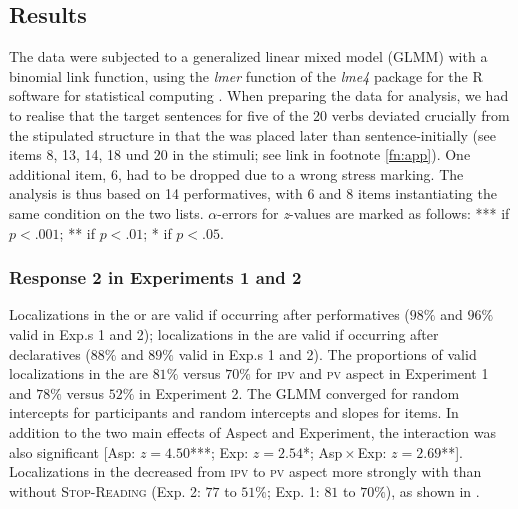 \documentclass[output=paper,colorlinks,citecolor=brown,newtxmath,hidelinks]{langscibook}
\begin{document}
\subsection{Results}

The data were subjected to a generalized linear mixed model (GLMM) with a binomial link function, using the \textit{lmer} function of the \textit{lme4} package \citep{Bates2015} for the R software for statistical computing \citep{team2014r}.
When preparing the data for analysis, we had to realise that the  target sentences for five of the 20 verbs deviated crucially from the stipulated structure in that the  was placed later than sentence-initially (see items 8, 13, 14, 18 und 20 in the stimuli; see link in footnote \ref{fn:app}). One additional item, 6, had to be dropped due to a wrong stress marking. The analysis is thus based on 14 performatives, with 6 and 8 items instantiating the same condition on the two lists. $\alpha$-errors for \textit{z}-values are marked as follows: \textup{***} if $p<.001$; \textup{**} if $p<.01$; \textup{*} if $p < .05$.

\subsubsection{Response 2 in Experiments 1 and 2}
Localizations in the  or  are valid if occurring after performatives ($98\%$ and $96\%$ valid in Exp.s 1 and 2); localizations in the  are valid if occurring after declaratives ($88\%$ and $89\%$ valid in Exp.s 1 and 2). The proportions of valid localizations in the  are $81\%$ versus $70\%$ for \textsc{ipv} and \textsc{pv} aspect in Experiment 1 and $78\%$ versus $52\%$ in Experiment 2. The GLMM converged for random intercepts for participants and random intercepts and slopes for items. In addition to the two main effects of Aspect and Experiment, the interaction was also significant [Asp: $z=4.50$\textup{***}; Exp: $z=2.54$\textup{*}; Asp${}\times{}$Exp: $z=2.69$\textup{**}]. Localizations in the  decreased from \textsc{ipv} to \textsc{pv} aspect more strongly with than without \textsc{Stop-Reading} (Exp. 2: $77$ to $51\%$; Exp. 1: $81$ to $70\%$), as shown in .
\end{document}
